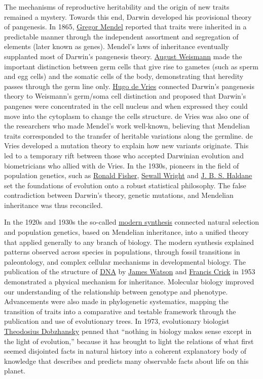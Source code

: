 The mechanisms of reproductive heritability and the origin of new traits
remained a mystery. Towards this end, Darwin developed his provisional
theory of pangenesis. In 1865, \href{https://en.wikipedia.org/wiki/Gregor_Mendel}{Gregor Mendel} reported that traits were
inherited in a predictable manner through the independent assortment and
segregation of elements (later known as genes). Mendel's laws of
inheritance eventually supplanted most of Darwin's pangenesis theory.
\href{https://en.wikipedia.org/wiki/August_Weismann}{August Weismann} made the important distinction between germ cells that
give rise to gametes (such as sperm and egg cells) and the somatic cells
of the body, demonstrating that heredity passes through the germ line
only. \href{https://en.wikipedia.org/wiki/Hugo_de_Vries}{Hugo de Vries} connected Darwin's pangenesis theory to Weismann's
germ/soma cell distinction and proposed that Darwin's pangenes were
concentrated in the cell nucleus and when expressed they could move into
the cytoplasm to change the cells structure. de Vries was also one of
the researchers who made Mendel's work well-known, believing that
Mendelian traits corresponded to the transfer of heritable variations
along the germline. de Vries developed a mutation theory to explain how
new variants originate. This led to a temporary rift between those who
accepted Darwinian evolution and biometricians who allied with de Vries.
In the 1930s, pioneers in the field of population genetics, such as
\href{}{Ronald Fisher}, \href{https://en.wikipedia.org/wiki/Sewall_Wright}{Sewall Wright} and \href{https://en.wikipedia.org/wiki/J._B._S._Haldane}{J. B. S. Haldane} set the foundations of
evolution onto a robust statistical philosophy. The false contradiction
between Darwin's theory, genetic mutations, and Mendelian inheritance
was thus reconciled.

In the 1920s and 1930s the so-called
\href{https://en.wikipedia.org/wiki/Modern_synthesis_(20th_century)}{modern
synthesis} connected natural selection and population genetics, based on
Mendelian inheritance, into a unified theory that applied generally to
any branch of biology. The modern synthesis explained patterns observed
across species in populations, through fossil transitions in
paleontology, and complex cellular mechanisms in developmental biology.
The publication of the structure of
\href{https://en.wikipedia.org/wiki/DNA}{DNA} by
\href{https://en.wikipedia.org/wiki/James_Watson}{James Watson} and
\href{https://en.wikipedia.org/wiki/Francis_Crick}{Francis Crick} in
1953 demonstrated a physical mechanism for inheritance. Molecular
biology improved our understanding of the relationship between genotype
and phenotype. Advancements were also made in phylogenetic systematics,
mapping the transition of traits into a comparative and testable
framework through the publication and use of evolutionary trees. In
1973, evolutionary biologist
\href{https://en.wikipedia.org/wiki/Theodosius_Dobzhansky}{Theodosius
Dobzhansky} penned that ``nothing in biology makes sense except in the
light of evolution,'' because it has brought to light the relations of
what first seemed disjointed facts in natural history into a coherent
explanatory body of knowledge that describes and predicts many
observable facts about life on this planet.


